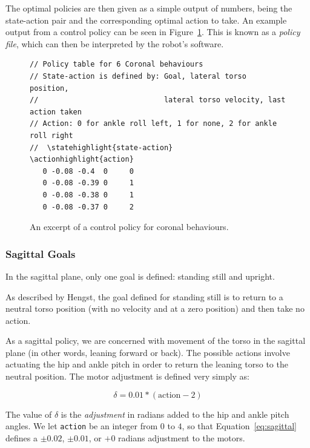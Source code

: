 The optimal policies are then given as a simple output of numbers, being the state-action pair and the corresponding optimal action to take. An example output from a control policy can be seen in Figure~\ref{fig:policy}. This is known as a \textit{policy file}, which can then be interpreted by the robot's software.

\begin{figure}[h]
\newcommand\statehighlight[1]{\textcolor[rgb]{1,0,0}{#1}}
\newcommand\actionhighlight[1]{\textcolor[rgb]{0,0,1}{#1}}
\begin{Verbatim}[commandchars=\\\{\},frame=single]
// Policy table for 6 Coronal behaviours
// State-action is defined by: Goal, lateral torso position, 
//                             lateral torso velocity, last action taken
// Action: 0 for ankle roll left, 1 for none, 2 for ankle roll right
//  \statehighlight{state-action}    \actionhighlight{action}
   0 -0.08 -0.4  0     0
   0 -0.08 -0.39 0     1
   0 -0.08 -0.38 0     1
   0 -0.08 -0.37 0     2
\end{Verbatim}
\vspace{-15pt}
\caption{An excerpt of a control policy for coronal behaviours.}
\label{fig:policy}
\end{figure}

\subsubsection{Sagittal Goals}
\label{sec:sagittal}

In the sagittal plane, only one goal is defined: standing still and upright.

As described by Hengst\cite{sagittal}, the goal defined for standing still is to return to a neutral torso position (with no velocity and at a zero position) and then take no action.

As a sagittal policy, we are concerned with movement of the torso in the sagittal plane (in other words, leaning forward or back). The possible actions involve actuating the hip and ankle pitch in order to return the leaning torso to the neutral position. The motor adjustment is defined very simply as:

\begin{equation} \label{eq:sagittal}
\delta = 0.01 * (\text{action} - 2)
    \end{equation}

The value of $\delta$ is the \textit{adjustment} in radians added to the hip and ankle pitch angles. We let \texttt{action} be an integer from $0$ to $4$, so that Equation~\ref{eq:sagittal} defines a $\pm0.02$, $\pm0.01$, or $+0$ radians adjustment to the motors.

